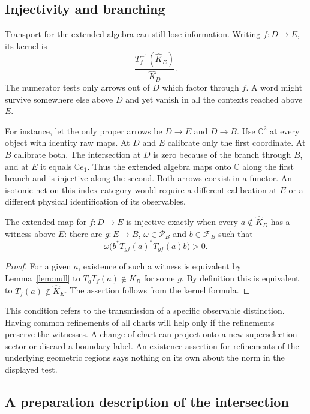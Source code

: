 \documentclass[11pt,letterpaper]{article}
\newcommand{\F}{\mathcal F}
\newcommand{\Probes}{\mathcal P}
\newcommand{\sat}{\widehat K}
\begin{document}
\subsection{Injectivity and branching}

Transport for the extended algebra can still lose information. Writing $f:D\to E$, its kernel is
\[
 \frac{T_f^{-1}(\sat_E)}{\sat_D}.
\]
The numerator tests only arrows out of $D$ which factor through $f$. A word might survive somewhere else above $D$ and yet vanish in all the contexts reached above $E$.

For instance, let the only proper arrows be $D\to E$ and $D\to B$. Use $\mathbb C^2$ at every object with identity raw maps. At $D$ and $E$ calibrate only the first coordinate. At $B$ calibrate both. The intersection at $D$ is zero because of the branch through $B$, and at $E$ it equals $\mathbb Ce_1$. Thus the extended algebra maps onto $\mathbb C$ along the first branch and is injective along the second. Both arrows coexist in a functor. An isotonic net on this index category would require a different calibration at $E$ or a different physical identification of its observables.

\begin{proposition}\label{prop:faith}
The extended map for $f:D\to E$ is injective exactly when every $a\notin\sat_D$ has a witness above $E$: there are $g:E\to B$, $\omega\in\Probes_B$ and $b\in\F_B$ such that
\[
 \omega\big(b^*T_{gf}(a)^*T_{gf}(a)b\big)>0 .
\]
\end{proposition}
\begin{proof}
For a given $a$, existence of such a witness is equivalent by Lemma~\ref{lem:null} to $T_gT_f(a)\notin K_B$ for some $g$. By definition this is equivalent to $T_f(a)\notin\sat_E$. The assertion follows from the kernel formula.
\end{proof}

This condition refers to the transmission of a specific observable distinction. Having common refinements of all charts will help only if the refinements preserve the witnesses. A change of chart can project onto a new superselection sector or discard a boundary label. An existence assertion for refinements of the underlying geometric regions says nothing on its own about the norm in the displayed test.

\subsection{A preparation description of the intersection}
\end{document}
